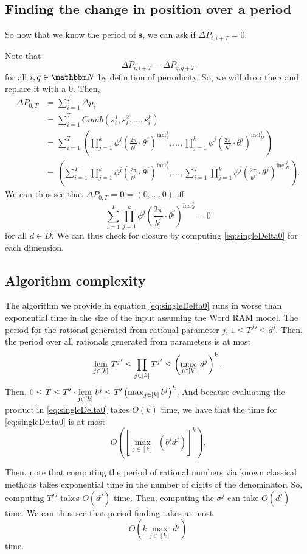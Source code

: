 \documentclass[11pt,titlepage]{article}
\newcommand{\rationalPeriod}{{T^j}'}
\newcommand{\rationalPeriodTotal}{{T}'}
\newcommand{\totalPeriod}{T}
\newcommand{\totalStateNotime}{\pmb{s}}
\newcommand{\combWithState}[1]{Comb\left(s^1_{#1}, s^2_{#1}, ..., s^k_{#1}\right)}
\newcommand{\inclIndic}[2]{{\mathrm{incl}_{#1}^{#2}}}
\newcommand{\numbToAngle}{\frac{2\pi}{b^j}}
\newcommand{\sinOrCos}{\phi^j}
\newcommand{\combSingleTerm}[1]{\prod_{j=1}^k \sinOrCos\left(\numbToAngle \cdot \theta^j\right) ^ {\inclIndic{#1}{j}}}
\newcommand{\digSumPeriodic}{\sigma^j}
\begin{document}
\subsection{Finding the change in position over a period}
So now that we know the period of $\totalStateNotime$, we can ask if
$\Delta P_{i, i + T} = 0$.

Note that 
$$
\Delta P_{i, i + T} = \Delta P_{q, q + T}
$$
for all $i, q \in \N$ by definition of periodicity.
So, we will drop the $i$ and replace it with a $0$.
Then,
\begin{align*}
  \Delta P_{0, T} &= \sum_{i = 1}^T \Delta p_i \\
  &= \sum_{i = 1}^T \combWithState{i} \\
  &= \sum_{i = 1}^T \left(\combSingleTerm{1}, ..., \combSingleTerm{D}\right) \\
  &= \left(\sum_{i = 1}^T \combSingleTerm{1}, ..., \sum_{i = 1}^T \combSingleTerm{D}\right).
\end{align*}
We can thus see that $\Delta P_{0, T} = \pmb{0} = (0, ..., 0)$ iff 
\begin{equation}
\label{eq:singleDelta0}
\sum_{i = 1}^T \combSingleTerm{d} = 0
\end{equation}
for all $d \in D$.
We can thus check for closure by computing \eqref{eq:singleDelta0} for each dimension.

\subsection{Algorithm complexity}
The algorithm we provide in equation \eqref{eq:singleDelta0} runs in worse than exponential time
in the size of the input assuming the Word RAM model. 
The period for the rational generated from rational parameter $j$, $1 \leq \rationalPeriod \leq d^j$. Then,
the period over all rationals generated from parameters is at most 
$$
  \lcm{j \in [k]} \rationalPeriod \leq \prod_{j \in [k]} \rationalPeriod \leq \left(\max_{j \in [k]} \; d^j \right)^k.
$$
Then, 
$0 \leq \totalPeriod \leq \rationalPeriodTotal \cdot \lcm{j \in [k]} b^j \leq \rationalPeriodTotal \left(\max_{j \in [k]} b^j\right)^k$.
And because evaluating the product in \eqref{eq:singleDelta0} takes $O(k)$ time,
we have that the time for \eqref{eq:singleDelta0} is at most
$$
  O\left(\left[\max_{j \in [k]} \; (b^j d^j)\right]^k \right).
$$

Then, note that computing the period of rational numbers via known classical methods takes 
exponential time in the number of digits of the denominator. So, computing
$\rationalPeriod$ takes $\widetilde{O}(d^j)$ time. Then, computing the $\digSumPeriodic$
can take $O(d^j)$ time. 
We can thus see that period finding takes at most
$$
\widetilde{O}\left(k \max_{j \in [k]} d^j \right)
$$
time.
\end{document}

